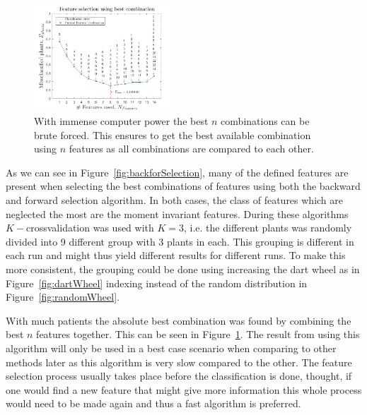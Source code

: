 \begin{figure}[H]
\centering
\includegraphics[width=0.47\textwidth]{./figure/result/Quadratic/combination.png}
\caption{\label{fig:combSelection} With immense computer power the best $n$ combinations can be brute forced. This ensures to get the best available combination using $n$ features as all combinations are compared to each other.  }
\end{figure}

As we can see in Figure~\ref{fig:backforSelection}, many of the defined features are present when selecting the best combinations of features using both the backward and forward selection algorithm. In both cases, the class of features which are neglected the most are the moment invariant features. During these algorithms $K-$crossvalidation was used with $K=3$, i.e. the different plants was randomly divided into 9 different group with 3 plants in each. This grouping is different in each run and might thus yield different results for different runs. To make this more consistent, the grouping could be done using increasing the dart wheel as in Figure~\ref{fig:dartWheel} indexing instead of the random distribution in Figure~\ref{fig:randomWheel}.

With much patients the absolute best combination was found by combining the best $n$ features together. This can be seen in Figure~\ref{fig:combSelection}. The result from using this algorithm will only be used in a best case scenario when comparing to other methods later as this algorithm is very slow compared to the other. The feature selection process usually takes place before the classification is done, thought, if one would find a new feature that might give more information this whole process would need to be made again and thus a fast algorithm is preferred. 


\begin{figure}
\centering

\end{figure}

\begin{figure}
\centering


\end{figure}



